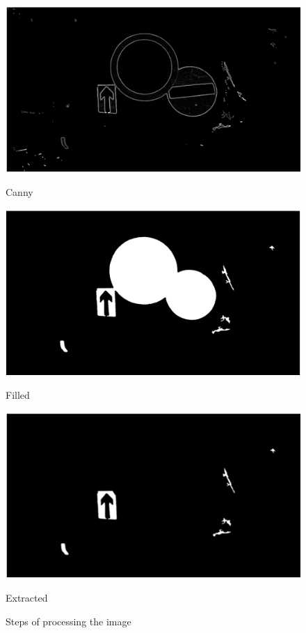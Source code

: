 \begin{figure}[H]
	\endminipage\hfill
	\newline
	\includegraphics[width=\linewidth]{images/zynq3.png}
	\caption{Canny}\label{fig:zynq3}
	\endminipage\hfill
	\includegraphics[width=\linewidth]{images/zynq4.png}
	\caption{Filled}\label{fig:zynq4}
	\endminipage\hfill
	\includegraphics[width=\linewidth]{images/zynq5.png}
	\caption{Extracted}\label{fig:zynq5}
	\endminipage
	\newline
	\caption*{Steps of processing the image \cite{zynq}}
\end{figure}

